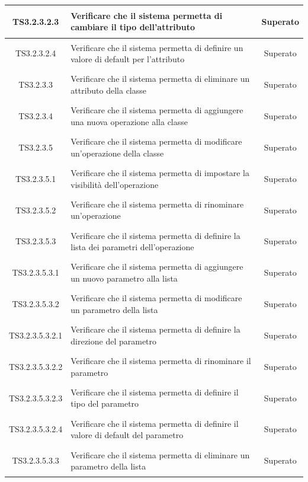 \documentclass[../PianoDiQualifica.tex]{subfiles}
\begin{document}
\begin{longtable}{|c|>{\centering}p{10cm}|c|}
	\hline
	\hypertarget{TS3.2.3.2.3}{TS3.2.3.2.3} & Verificare che il sistema permetta di cambiare il tipo dell'attributo & Superato \\
	\hline
	\hypertarget{TS3.2.3.2.4}{TS3.2.3.2.4} & Verificare che il sistema permetta di definire un valore di default per l'attributo & Superato \\
	\hline
	\hypertarget{TS3.2.3.3}{TS3.2.3.3} & Verificare che il sistema permetta di eliminare un attributo della classe & Superato \\
	\hline
	\hypertarget{TS3.2.3.4}{TS3.2.3.4} & Verificare che il sistema permetta di aggiungere una nuova operazione alla classe & Superato \\
	\hline
	\hypertarget{TS3.2.3.5}{TS3.2.3.5} & Verificare che il sistema permetta di modificare un'operazione della classe & Superato \\
	\hline
	\hypertarget{TS3.2.3.5.1}{TS3.2.3.5.1} & Verificare che il sistema permetta di impostare la visibilità dell'operazione & Superato \\
	\hline
	\hypertarget{TS3.2.3.5.2}{TS3.2.3.5.2} & Verificare che il sistema permetta di rinominare un'operazione & Superato \\
	\hline
	\hypertarget{TS3.2.3.5.3}{TS3.2.3.5.3} & Verificare che il sistema permetta di definire la lista dei parametri dell'operazione & Superato \\
	\hline
	\hypertarget{TS3.2.3.5.3.1}{TS3.2.3.5.3.1} & Verificare che il sistema permetta di aggiungere un nuovo parametro alla lista & Superato \\
	\hline
	\hypertarget{TS3.2.3.5.3.2}{TS3.2.3.5.3.2} & Verificare che il sistema permetta di modificare un parametro della lista & Superato\\
	\hline
	\hypertarget{TS3.2.3.5.3.2.1}{TS3.2.3.5.3.2.1} & Verificare che il sistema permetta di definire la direzione del parametro & Superato \\
	\hline
	\hypertarget{TS3.2.3.5.3.2.2}{TS3.2.3.5.3.2.2} & Verificare che il sistema permetta di rinominare il parametro & Superato \\
	\hline
	\hypertarget{TS3.2.3.5.3.2.3}{TS3.2.3.5.3.2.3} & Verificare che il sistema permetta di definire il tipo del parametro & Superato \\
	\hline
	\hypertarget{TS3.2.3.5.3.2.4}{TS3.2.3.5.3.2.4} & Verificare che il sistema permetta di definire il valore di default del parametro & Superato \\
	\hline
	\hypertarget{TS3.2.3.5.3.3}{TS3.2.3.5.3.3} & Verificare che il sistema permetta di eliminare un parametro della lista & Superato \\

\end{longtable}
\end{document}

